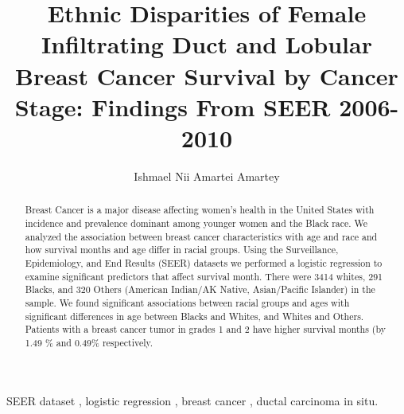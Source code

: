 \documentclass[times,sort&compress,3p]{elsarticle}
\theoremstyle{plain}
\theoremstyle{definition}
\begin{document}
\begin{frontmatter}

\title{Ethnic Disparities of Female Infiltrating Duct and Lobular Breast Cancer Survival by Cancer Stage: Findings From SEER 2006-2010}

\author{Ishmael Nii Amartei Amartey}

\address{Department of Statistics and Actuarial Science\\ Norhtern Illinois University, Dekalb, IL, 60115 \\ iamartey1@niu.edu \\
 May 08, 2023}


\begin{abstract}

Breast Cancer is a major disease affecting women's health in the United States with incidence and prevalence dominant among younger women and the Black race. We analyzed the association between breast cancer characteristics with age and race and how survival months and age differ in racial groups. Using the Surveillance, Epidemiology, and End Results (SEER) datasets we performed a logistic regression to examine significant predictors that affect survival month. There were 3414 whites, 291 Blacks, and 320 Others (American Indian/AK Native, Asian/Pacific Islander) in the sample. We found significant associations between racial groups and ages with significant differences in age between Blacks and Whites, and Whites and Others.
Patients with a breast cancer tumor in grades 1 and 2 have higher survival months (by 1.49 \% and 0.49\% respectively.
 
\end{abstract}

\begin{keyword} %
 SEER dataset  \sep
logistic regression \sep
breast cancer \sep
ductal carcinoma in situ.
\end{keyword}

\end{frontmatter}
\end{document}
